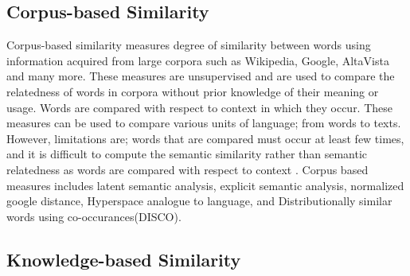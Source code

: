 \documentclass{article}
\begin{document}
	
\subsection{Corpus-based Similarity}
	
	 Corpus-based similarity measures degree of similarity between words using information acquired from large corpora such as Wikipedia, Google, AltaVista and many more.
These measures are unsupervised and are used to compare the relatedness of words in corpora without prior knowledge of their meaning or usage. Words are compared with respect to context in which they occur. These measures can be used to compare various units of language; from words to texts. However, limitations are; words that are compared must occur at least few times, and it is difficult to compute the semantic similarity rather than semantic relatedness as words are compared with respect to context \cite{corpusbased}. 
Corpus based measures includes latent semantic analysis, explicit semantic analysis, normalized google distance, Hyperspace analogue to language, and Distributionally similar words using co-occurances(DISCO)\cite{survey}.

\subsection{Knowledge-based Similarity}
\end{document}
